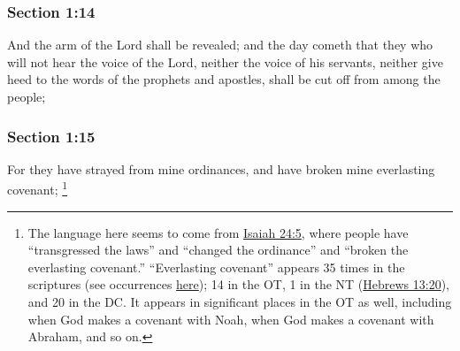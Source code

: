
	\subsubsection{Section 1:14} %
		\label{DC1-14}

		And the arm of the Lord shall be revealed; and the day cometh that they who will not hear the voice of the Lord, neither the voice of his servants, neither give heed to the words of the prophets and apostles, shall be cut off from among the people;


	\subsubsection{Section 1:15} %
		\label{DC1-15}

		For they have strayed from mine ordinances, and have broken mine everlasting covenant;%
		\footnote{%
			The language here seems to come from \hyperref[ISAIAH-24-5]{Isaiah 24:5}, where people have ``transgressed the laws'' and ``changed the ordinance'' and ``broken the everlasting covenant.'' ``Everlasting covenant'' appears 35 times in the scriptures (see occurrences \hyperref[COVENANT-PHRASES]{here}); 14 in the OT, 1 in the NT (\hyperref[HEBREWS-13-20]{Hebrews 13:20}), and 20 in the DC. It appears in significant places in the OT as well, including when God makes a covenant with Noah, when God makes a covenant with Abraham, and so on.
			} 


